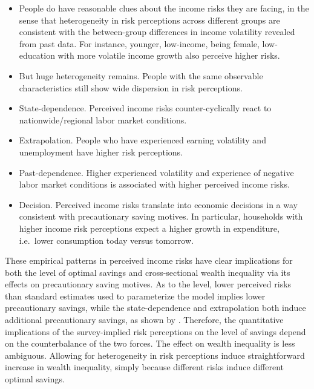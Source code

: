 \begin{itemize}

\item People do have reasonable clues about the income risks they are facing, in the sense that heterogeneity in risk perceptions across different groups are consistent with the between-group differences in income volatility revealed from past data. For instance, younger, low-income, being female, low-education with more volatile income growth also perceive higher risks.

\item But huge heterogeneity remains. People with the same observable characteristics still show wide dispersion in risk perceptions. 

\item State-dependence.  Perceived income risks counter-cyclically react to nationwide/regional labor market conditions. 

\item Extrapolation. People who have experienced earning volatility and unemployment have higher risk perceptions. 

\item Past-dependence. Higher experienced volatility and experience of negative labor market conditions is associated with higher perceived income risks. 
 
 
\item Decision. Perceived income risks translate into economic decisions in a way consistent with precautionary saving motives. In particular, households with higher income risk perceptions expect a higher growth in expenditure, i.e.~lower consumption today versus tomorrow.
\end{itemize}


These empirical patterns in perceived income risks have clear implications for both the level of optimal savings and cross-sectional wealth inequality via its effects on precautionary saving motives. As to the level, lower perceived risks than standard estimates used to parameterize the model implies lower precautionary savings, while the state-dependence and extrapolation both induce additional precautionary savings, as shown by \cite{caballero1990consumption}. Therefore, the quantitative implications of the survey-implied risk perceptions on the level of savings depend on the counterbalance of the two forces. The effect on wealth inequality is less ambiguous. Allowing for heterogeneity in risk perceptions induce straightforward increase in wealth inequality, simply because different risks induce different optimal savings. 

